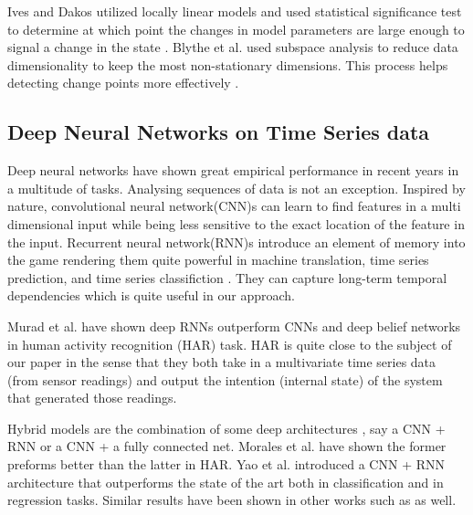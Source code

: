 Ives and Dakos utilized locally linear models and used statistical significance test to determine at which point the changes in model parameters are large enough to signal a change in the state \cite{Ives2012}. Blythe et al. used subspace analysis to reduce data dimensionality to keep the most non-stationary dimensions. This process helps detecting change points more effectively \cite{Blythe2012}. 



\subsection{Deep Neural Networks on Time Series data}
Deep neural networks have shown great empirical performance in recent years in a multitude of tasks. 
Analysing sequences of data is not an exception. Inspired by nature, convolutional neural network(CNN)s can learn to find features in a multi dimensional input while being less sensitive to the exact location of the feature in the input. \cite{lecun2015deep} Recurrent neural network(RNN)s introduce an element of memory into the game rendering them quite powerful in machine translation, time series prediction, and time series classifiction  \cite{cho2014learning, zhang2000predicting, wang2017time, murad2017deep, yang2015deep, Ordonez2016}. They can capture long-term temporal dependencies which is quite useful in our approach. \cite{Che2018}

Murad et al. \cite{murad2017deep} have shown deep RNNs outperform CNNs and deep belief networks in human activity recognition (HAR) task. HAR is quite close to the subject of our paper in the sense that they both take in a multivariate time series data (from sensor readings) and output the intention (internal state) of the system that generated those readings. 


Hybrid models are the combination of some deep architectures \cite{wang2019deep}, say a CNN + RNN or a CNN + a fully connected net. Morales et al. have shown the former preforms better than the latter in HAR\cite{morales2016deep}. Yao et al. \cite{deepsense} introduced a CNN + RNN architecture that outperforms the state of the art both in  classification and in regression tasks. Similar results have been shown in other works such as \cite{Ordonez2016, singh2017transforming, zheng2016exploiting} as well.
